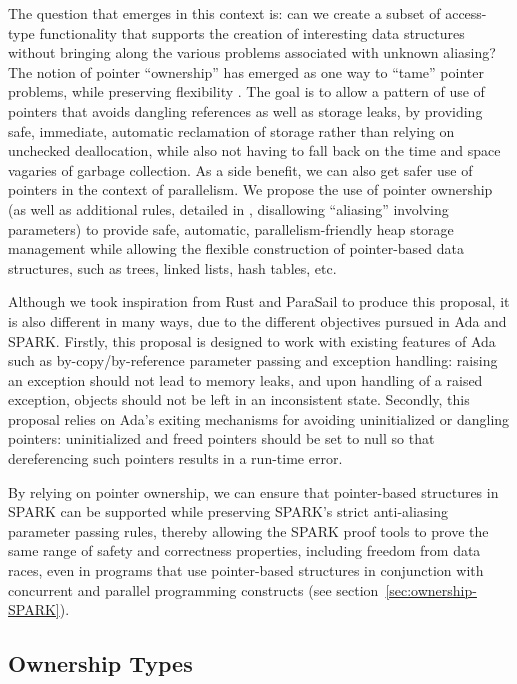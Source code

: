 \documentclass[runningheads]{llncs}
\begin{document}
The question that emerges in this context is: can we create a subset of access-type functionality that supports the creation of interesting data structures without bringing along
the various problems associated with unknown aliasing? The notion of pointer ``ownership'' has emerged as one way to ``tame'' pointer problems, while preserving flexibility \cite{POM}.  The goal is to allow a pattern of use
of pointers that avoids dangling references as well as storage leaks, by providing safe, immediate, automatic reclamation of storage rather than relying on unchecked deallocation,
while also not having to fall back on the time and space vagaries of garbage collection.  As a side benefit, we can also get safer use of pointers in the context of parallelism.
We propose the use of pointer ownership (as well as additional rules, detailed in \cite{AI2018}, disallowing ``aliasing'' involving parameters) to provide safe,
automatic, parallelism-friendly heap storage management while allowing the flexible construction of pointer-based data structures, such as trees, linked lists, hash tables, etc.

Although we took inspiration from Rust and ParaSail to produce this proposal, it is also different in many ways, due to the different objectives pursued in Ada and SPARK. Firstly,
this proposal is designed to work with existing features of Ada such as by-copy/by-reference parameter passing and exception handling: raising an exception should not lead to
memory leaks, and upon handling of a raised exception, objects should not be left in an inconsistent state. Secondly, this proposal relies on Ada's exiting mechanisms
for avoiding uninitialized or dangling pointers: uninitialized and freed pointers should be set to null so that dereferencing such pointers results in a run-time error.

By relying on pointer ownership, we can ensure that pointer-based
structures in SPARK can be supported while preserving SPARK's
strict anti-aliasing parameter passing rules,
thereby allowing the SPARK proof tools to prove the same
range of safety and correctness properties, including freedom from
data races, even in programs that use
pointer-based structures in conjunction with concurrent and
parallel programming constructs (see section~\ref{sec:ownership-SPARK}).

\subsection{Ownership Types}
\label{sec:ownership}
\end{document}
